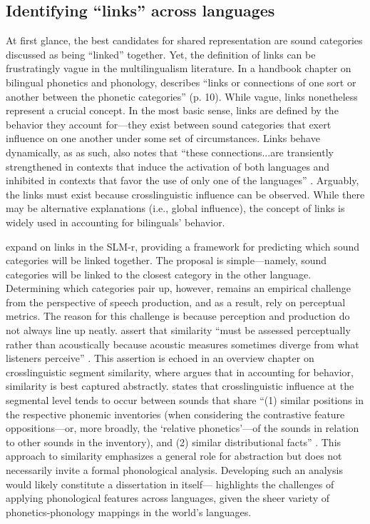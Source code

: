 \subsection{Identifying ``links'' across languages}\label{ch4:sec:links}

At first glance, the best candidates for shared representation are sound categories discussed as being ``linked'' together. Yet, the definition of links can be frustratingly vague in the multilingualism literature. In a handbook chapter on bilingual phonetics and phonology, \citet{simonet_2016_bilingualism} describes ``links or connections of one sort or another between the phonetic categories'' (p. 10). While vague, links nonetheless represent a crucial concept. In the most basic sense, links are defined by the behavior they account for---they exist between sound categories that exert influence on one another under some set of circumstances. Links behave dynamically, as as such,  \citeauthor{simonet_2016_bilingualism} also notes that ``these connections...are transiently strengthened in contexts that induce the activation of both languages and inhibited in contexts that favor the use of only one of the languages'' \citeyearpar[][p. 10]{simonet_2016_bilingualism}. Arguably, the links must exist because crosslinguistic influence can be observed. While there may be alternative explanations (i.e., global influence), the concept of links is widely used in accounting for bilinguals' behavior. 

\citet{flege_2021_slmr} expand on links in the SLM-r, providing a framework for predicting which sound categories will be linked together. The proposal is simple---namely, sound categories will be linked to the closest category in the other language. Determining which categories pair up, however, remains an empirical challenge from the perspective of speech production, and as a result, \citet{flege_2021_slmr} rely on perceptual metrics. The reason for this challenge is because perception and production do not always line up neatly. \citeauthor{flege_2021_slmr} assert that similarity ``must be assessed perceptually rather than acoustically because acoustic measures sometimes diverge from what listeners perceive'' \citeyearpar[][p. 33]{flege_2021_slmr}. This assertion is echoed in an overview chapter on crosslinguistic segment similarity, where \citet{chang_2015_similarity} argues that in accounting for behavior, similarity is best captured abstractly. \citeauthor{chang_2015_similarity} states that crosslinguistic influence at the segmental level tends to occur between sounds that share ``(1) similar positions in the respective phonemic inventories (when considering the contrastive feature oppositions---or, more broadly, the `relative phonetics'---of the sounds in relation to other sounds in the inventory), and (2) similar distributional facts'' \citeyearpar[][p. 201]{chang_2015_similarity}. This approach to similarity emphasizes a general role for abstraction but does not necessarily invite a formal phonological analysis. Developing such an analysis would likely constitute a dissertation in itself---\citet{mielke_2012_similarity} highlights the challenges of applying phonological features across languages, given the sheer variety of phonetics-phonology mappings in the world's languages. 

